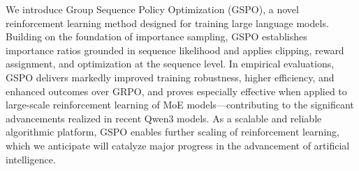 We introduce Group Sequence Policy Optimization (GSPO), a novel reinforcement learning method designed for training large language models. Building on the foundation of importance sampling, GSPO establishes importance ratios grounded in sequence likelihood and applies clipping, reward assignment, and optimization at the sequence level. In empirical evaluations, GSPO delivers markedly improved training robustness, higher efficiency, and enhanced outcomes over GRPO, and proves especially effective when applied to large-scale reinforcement learning of MoE models—contributing to the significant advancements realized in recent Qwen3 models. As a scalable and reliable algorithmic platform, GSPO enables further scaling of reinforcement learning, which we anticipate will catalyze major progress in the advancement of artificial intelligence.

